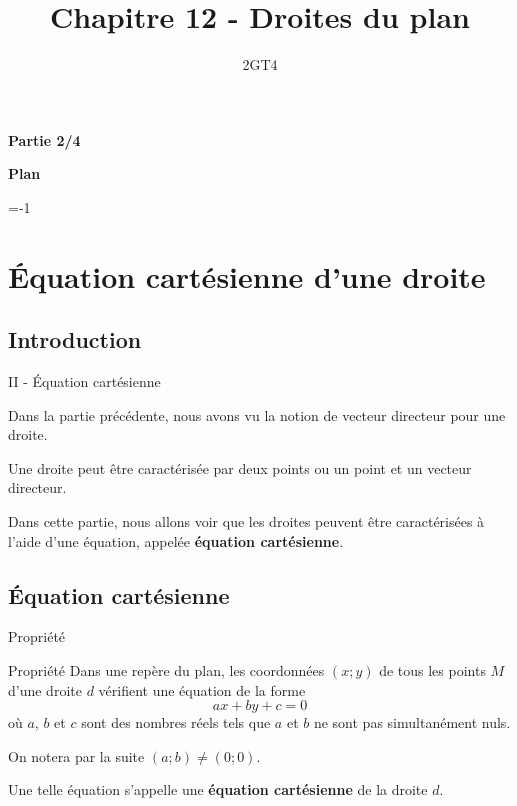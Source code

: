 \documentclass[12pt]{beamer}
\title[Droites du plan]{Chapitre 12 - Droites du plan}
\author{2GT4}
\date{}
\makeatletter
\newcommand{\setnextsection}[1]{%
  \setcounter{section}{\numexpr#1-1\relax}%
  \beamer@tocsectionnumber=\numexpr#1-1\relax\space}
\makeatother
\begin{document}
\begin{frame}
\titlepage

\begin{center} \textbf{Partie 2/4} \end{center}
\end{frame}

\begin{frame}
{\Large \textbf{Plan} }

\medskip

\tableofcontents
\end{frame}

\setnextsection{2}

\section{Équation cartésienne d'une droite}

\subsection{Introduction}

\begin{frame}{II - Équation cartésienne}

Dans la partie précédente, nous avons vu la notion de \og vecteur directeur \fg{} pour une droite. 

\bigskip

Une droite peut être caractérisée par deux points ou un point et un vecteur directeur.

\bigskip

Dans cette partie, nous allons voir que les droites peuvent être caractérisées à l'aide d'une équation, appelée \textbf{équation cartésienne}.
\end{frame}

\subsection{Équation cartésienne}

\begin{frame}{Propriété}

\begin{exampleblock}{Propriété}
Dans une repère du plan, les coordonnées $(x;y)$ de tous les points $M$ d'une droite $d$ vérifient une équation de la forme \[ax+by+c = 0\]
où $a$, $b$ et $c$ sont des nombres réels tels que $a$ et $b$ ne sont pas simultanément nuls. \par 
On notera par la suite $(a;b) \neq (0;0)$. \par 
Une telle équation s'appelle une \textbf{équation cartésienne} de la droite $d$.
\end{exampleblock}

\end{frame}
\end{document}
